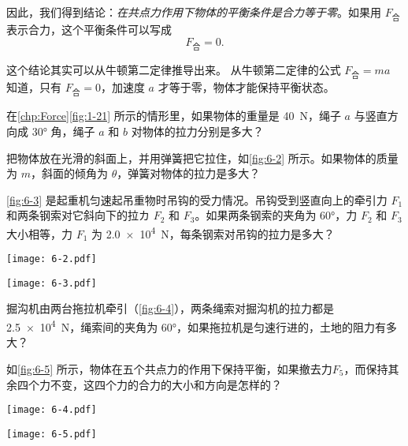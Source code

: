 因此，我们得到结论：\emph{在共点力作用下物体的平衡条件是合力等于零}。如果用 $F_{\text{合}}$ 表示合力，这个平衡条件可以写成
\[F_{\text{合}}=0.\] 

这个结论其实可以从牛顿第二定律推导出来。
从牛顿第二定律的公式 $F_{\text{合}}=ma$ 知道，只有 $F_{\text{合}}=0$，加速度 $a$ 才等于零，物体才能保持平衡状态。

\begin{Practice}
\begin{question}
  \item 在\cref{chp:Force}\cref{fig:1-21} 所示的情形里，如果物体的重量是 \qty{40}{N}，绳子 $a$ 与竖直方向成 \ang{30} 角，绳子 $a$ 和 $b$ 对物体的拉力分别是多大？
  \item 把物体放在光滑的斜面上，并用弹簧把它拉住，如\cref{fig:6-2} 所示。如果物体的质量为 $m$，斜面的倾角为 $\theta$，弹簧对物体的拉力是多大？
  \item \cref{fig:6-3} 是起重机匀速起吊重物时吊钩的受力情况。吊钩受到竖直向上的牵引力 $F_1$ 和两条钢索对它斜向下的拉カ $F_2$ 和 $F_3$。如果两条钢索的夹角为 \ang{60}，力 $F_2$ 和 $F_3$ 大小相等，力 $F_1$ 为 \qty{2.0e4}{N}，每条钢索对吊钩的拉力是多大？
  \begin{figurehere}
    \begin{minipage}[b]{0.4\linewidth}
      \centering\texttt{[image: 6-2.pdf]}
      \caption{}\label{fig:6-2}
    \end{minipage}
    \begin{minipage}[b]{0.58\linewidth}
      \centering\texttt{[image: 6-3.pdf]}
      \caption{}\label{fig:6-3}
    \end{minipage}
  \end{figurehere}
  \item 掘沟机由两台拖拉机牵引（\cref{fig:6-4}），两条绳索对掘沟机的拉力都是 \qty{2.5e4}{N}，绳索间的夹角为 \ang{60}，如果拖拉机是匀速行进的，土地的阻力有多大？
  \item 如\cref{fig:6-5} 所示，物体在五个共点力的作用下保持平衡，如果撤去力$F_5$，而保持其余四个力不变，这四个力的合力的大小和方向是怎样的？
\begin{figurehere}
  \begin{minipage}[b]{0.48\linewidth}\centering
    \texttt{[image: 6-4.pdf]}
    \caption{}\label{fig:6-4}
  \end{minipage}
  \begin{minipage}[b]{0.48\linewidth}\centering
    \texttt{[image: 6-5.pdf]}
    \caption{}\label{fig:6-5}
  \end{minipage}
\end{figurehere}
\end{question}
\end{Practice}

